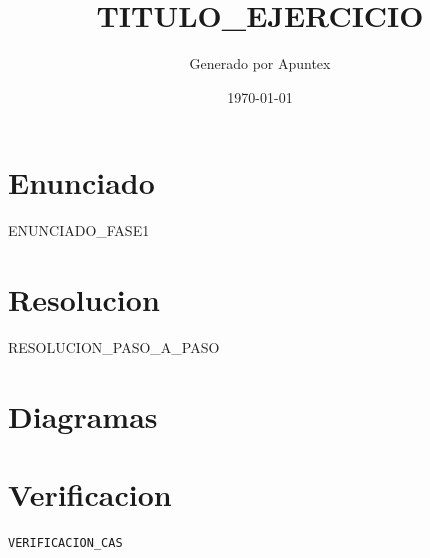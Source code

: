 \documentclass[12pt,a4paper]{article}
\title{TITULO_EJERCICIO}
\author{Generado por Apuntex}
\date{\today}
\begin{document}
\maketitle

\section{Enunciado}
ENUNCIADO_FASE1

\section{Resolucion}
RESOLUCION_PASO_A_PASO

\section{Diagramas}

\section{Verificacion}
\begin{verbatim}
VERIFICACION_CAS
\end{verbatim}
\end{document}
